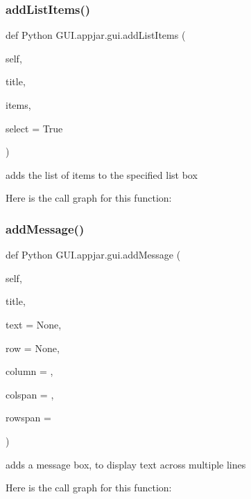 \subsubsection{\texorpdfstring{add\+List\+Items()}{addListItems()}}
{\footnotesize\ttfamily def Python G\+U\+I.\+appjar.\+gui.\+add\+List\+Items (\begin{DoxyParamCaption}\item[{}]{self,  }\item[{}]{title,  }\item[{}]{items,  }\item[{}]{select = {\ttfamily True} }\end{DoxyParamCaption})}

\begin{DoxyVerb}adds the list of items to the specified list box \end{DoxyVerb}
 Here is the call graph for this function\+:
\mbox{\label{class_python_01_g_u_i_1_1appjar_1_1gui_a1bcf7d9e270df5a34c9e718db68925a7}} 
\subsubsection{\texorpdfstring{add\+Message()}{addMessage()}}
{\footnotesize\ttfamily def Python G\+U\+I.\+appjar.\+gui.\+add\+Message (\begin{DoxyParamCaption}\item[{}]{self,  }\item[{}]{title,  }\item[{}]{text = {\ttfamily None},  }\item[{}]{row = {\ttfamily None},  }\item[{}]{column = {},  }\item[{}]{colspan = {},  }\item[{}]{rowspan = {} }\end{DoxyParamCaption})}

\begin{DoxyVerb}adds a message box, to display text across multiple lines \end{DoxyVerb}
 Here is the call graph for this function\+:
\mbox{\label{class_python_01_g_u_i_1_1appjar_1_1gui_a2ea16e4a9a46582f47b6509cc82f4ce3}} 
